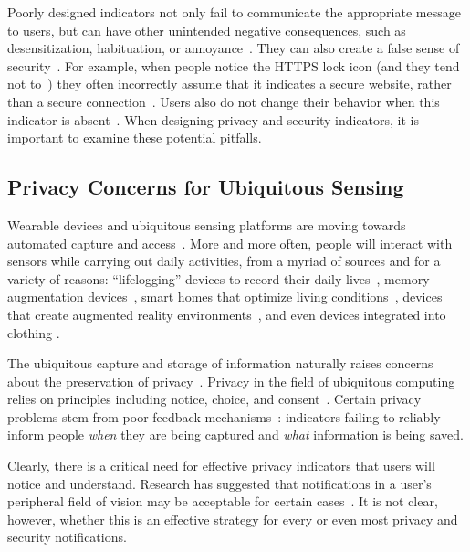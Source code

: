\documentclass{sigchi}
\begin{document}
Poorly designed indicators not only fail to communicate the appropriate message to users, but can have other unintended negative consequences, such as desensitization, habituation, or  annoyance~\cite{stewart1994intended}. They can also create a false sense of security~\cite{cannella2004secure}. For example, when people notice the HTTPS lock icon (and they tend not to~\cite{whalen2005gathering}) they often incorrectly assume that it indicates a secure website, rather than a secure connection~\cite{Friedman2002}.  Users also do not change their behavior when this indicator is absent~\cite{schechter2007emperor}. When designing privacy and security indicators, it is important to examine these potential pitfalls.
 
 \subsection{Privacy Concerns for Ubiquitous Sensing} 
Wearable devices and ubiquitous sensing platforms are moving towards automated capture and access~\cite{abowd2000charting}. More and more often, people will interact with sensors while carrying out daily activities, from a myriad of sources and for a variety of reasons: ``lifelogging'' devices to record their daily lives~\cite{hoyle2014privacy,dickie2004augmenting}, memory augmentation devices~\cite{chen2010augmenting,devaul2003memory,kalnikaite2010now}, smart homes that optimize living conditions~\cite{chan2008review,chan2009smart,edwards2001home}, devices that create augmented reality environments~\cite{azuma1997survey,azuma2001recent}, and even devices integrated into clothing \cite{anliker2001weararm}.
 
The ubiquitous capture and storage of information naturally raises concerns about the preservation of privacy~\cite{palen2003unpacking}. Privacy in the field of ubiquitous computing relies on principles including notice, choice, and consent~\cite{langheinrich2001privacy}. Certain privacy problems stem from poor feedback mechanisms~\cite{bellotti1993design,dourish2004security}: indicators failing to reliably inform people {\it when} they are being captured and {\it what} information is being saved. 

Clearly, there is a critical need for effective privacy indicators that users will notice and understand. Research has suggested that notifications in a user's peripheral field of vision may be acceptable for certain cases~\cite{costanza2006eye}. It is not clear, however, whether this is an effective strategy for every or even most privacy and security notifications. 
\end{document}

